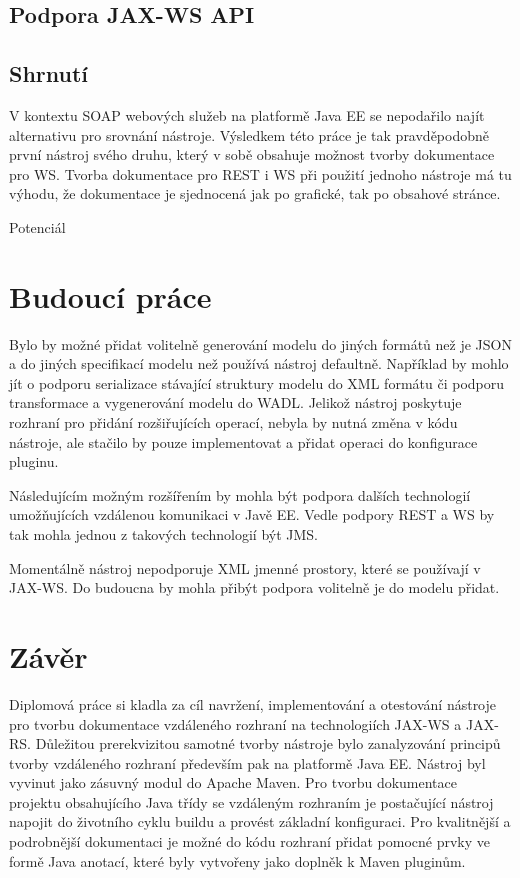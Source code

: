 \documentclass[11pt,twoside,a4paper]{book}
\begin{document}
\section{Podpora JAX-WS API}



\section{Shrnutí}

V kontextu SOAP webových služeb na platformě Java EE se nepodařilo najít alternativu pro
srovnání nástroje. Výsledkem této práce je tak pravděpodobně první nástroj svého druhu,
který v sobě obsahuje možnost tvorby dokumentace pro WS. Tvorba dokumentace pro REST
i WS při použití jednoho nástroje má tu výhodu, že dokumentace je sjednocená jak po
grafické, tak po obsahové stránce.

Potenciál


\chapter{Budoucí práce}

Bylo by možné přidat volitelně generování modelu do jiných formátů než je JSON a do jiných
specifikací modelu než používá nástroj defaultně. Například by mohlo jít o podporu
serializace stávající struktury modelu do XML formátu či podporu transformace a
vygenerování modelu do WADL. Jelikož nástroj poskytuje rozhraní pro přidání rozšiřujících
operací, nebyla by nutná změna v kódu nástroje, ale stačilo by pouze implementovat a přidat
operaci do konfigurace pluginu.

Následujícím možným rozšířením by mohla být podpora dalších technologií umožňujících
vzdálenou komunikaci v Javě EE. Vedle podpory REST a WS by tak mohla jednou z
takových technologií být JMS.

Momentálně nástroj nepodporuje XML jmenné prostory, které se používají v JAX-WS. Do
budoucna by mohla přibýt podpora volitelně je do modelu přidat.

\chapter{Závěr}

Diplomová práce si kladla za cíl navržení, implementování a otestování nástroje pro tvorbu
dokumentace vzdáleného rozhraní na technologiích JAX-WS a JAX-RS. Důležitou
prerekvizitou samotné tvorby nástroje bylo zanalyzování principů tvorby vzdáleného rozhraní
především pak na platformě Java EE. Nástroj byl vyvinut jako zásuvný modul do Apache
Maven. Pro tvorbu dokumentace projektu obsahujícího Java třídy se vzdáleným rozhraním je
postačující nástroj napojit do životního cyklu buildu a provést základní konfiguraci. Pro
kvalitnější a podrobnější dokumentaci je možné do kódu rozhraní přidat pomocné prvky ve
formě Java anotací, které byly vytvořeny jako doplněk k Maven pluginům.
\end{document}
